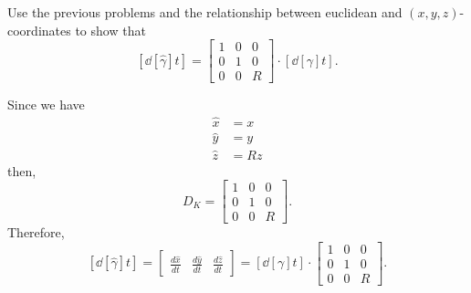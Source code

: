 \documentclass[newpage,hints,handout,12pt,noauthor,nooutcomes]{ximera}
\begin{document}
\begin{problem}
  Use the previous problems and the relationship between euclidean and
  $(x,y,z)$-coordinates to show that
  \[
  \left[\dd[\hat{\gamma}]{t}\right] =
  \begin{bmatrix}
    1 & 0 & 0\\
    0 & 1 & 0\\
    0 & 0 & R
  \end{bmatrix}\cdot \left[ \dd[\gamma]{t}\right].
  \]
  
\begin{freeResponse}
Since we have 
\begin{align*}
\hat{x}  &  =x\\
\hat{y}  &  =y\\
\hat{z}  &  =Rz
\end{align*}
then, 
\[
D_K = 
 \begin{bmatrix}
    1 & 0 & 0\\
    0 & 1 & 0\\
    0 & 0 & R
  \end{bmatrix}.
  \]
  Therefore, 
  \[
 \left[\dd[\hat{\gamma}]{t}\right] 
= \begin{bmatrix}
\frac{d\hat{x}}{dt} & \frac{d\hat{y}}{dt} & \frac{d\hat{z}}{dt}%
\end{bmatrix}
= \left[ \dd[\gamma]{t}\right] \cdot
  \begin{bmatrix}
    1 & 0 & 0\\
    0 & 1 & 0\\
    0 & 0 & R
  \end{bmatrix}.
\]
\end{freeResponse}

\end{problem}
\end{document}
